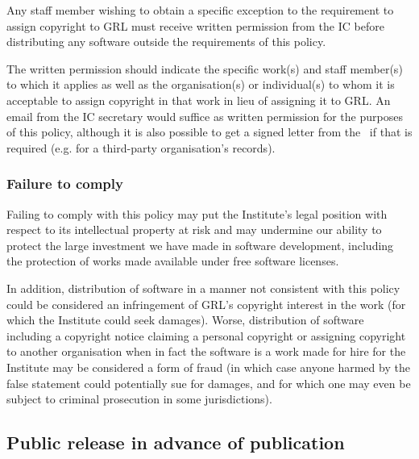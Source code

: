 \documentclass[10pt,a4paper]{article}
\begin{document}
\par Any staff member wishing to obtain a specific exception to the requirement to 
assign copyright to GRL must receive written permission from the IC before 
distributing any software outside the requirements of this policy. 

\par The written permission should indicate the specific work(s) and staff member(s) 
to which it applies as well as the organisation(s) or individual(s) to whom it is 
acceptable to assign copyright in that work in lieu of assigning it to GRL. An 
email from the IC secretary would suffice as written permission for the 
purposes of this policy, although it is also possible to get a signed letter from 
the \exectitle\ if that is required (e.g. for a third-party organisation's records). 


\subsubsection{Failure to comply}
\label{policy.copyright.failure}
\par Failing to comply with this policy may put the Institute's legal position with respect 
to its intellectual property at risk and may undermine our ability to protect the 
large investment we have made in software development, including the protection 
of works made available under free software licenses. 

\par In addition, distribution of software in a manner not consistent with this policy could be 
considered an infringement of GRL's copyright interest in the work (for which the 
Institute could seek damages). Worse, distribution of software including a copyright 
notice claiming a personal copyright or assigning copyright to another 
organisation when in fact the software is a work made for hire for the Institute may 
be considered a form of fraud (in which case anyone harmed by the false 
statement could potentially sue for damages, and for which one may even be subject 
to criminal prosecution in some jurisdictions). 




\subsection{Public release in advance of publication}
\end{document}
